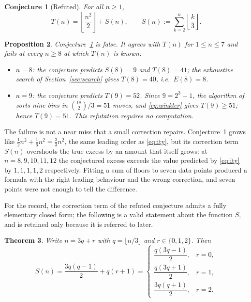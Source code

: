 \documentclass[11pt]{amsart}
\theoremstyle{plain}
\newtheorem{theorem}{Theorem}[section]
\newtheorem{proposition}[theorem]{Proposition}
\newtheorem{conjecture}[theorem]{Conjecture}
\theoremstyle{definition}
\theoremstyle{remark}
\begin{document}
\begin{conjecture}[Refuted]
\label{conj:main}
For all $n\ge 1$,
\[
T(n) = \left\lfloor \frac{n^2}{2}\right\rfloor + S(n), \qquad S(n) := \sum_{k=2}^n \left\lfloor \frac{k}{3}\right\rfloor.
\]
\end{conjecture}

\begin{proposition}
\label{prop:refutation}
Conjecture~\ref{conj:main} is false. It agrees with $T(n)$ for $1\le n\le 7$ and fails at every $n\ge 8$ at which $T(n)$ is known:
\begin{itemize}[leftmargin=*]
\item $n=8$: the conjecture predicts $S(8)=9$ and $T(8)=41$; the exhaustive search of Section~\ref{sec:search} gives $T(8)=40$, i.e.\ $E(8)=8$.
\item $n=9$: the conjecture predicts $T(9)=52$. Since $9=2^3+1$, the algorithm of \cite{ITY} sorts nine bins in $\binom{18}{2}/3=51$ moves, and \eqref{eq:winkler} gives $T(9)\ge 51$; hence $T(9)=51$. This refutation requires no computation.
\end{itemize}
\end{proposition}

The failure is not a near miss that a small correction repairs. Conjecture~\ref{conj:main} grows like $\tfrac12 n^2 + \tfrac16 n^2 = \tfrac23 n^2$, the same leading order as \eqref{eq:ity}, but its correction term $S(n)$ overshoots the true excess by an amount that itself grows: at $n=8,9,10,11,12$ the conjectured excess exceeds the value predicted by \eqref{eq:ity} by $1,1,1,1,2$ respectively. Fitting a sum of floors to seven data points produced a formula with the right leading behaviour and the wrong correction, and seven points were not enough to tell the difference.

For the record, the correction term of the refuted conjecture admits a fully elementary closed form; the following is a valid statement about the function $S$, and is retained only because it is referred to later.

\begin{theorem}
\label{thm:closedform}
Write $n = 3q+r$ with $q=\lfloor n/3\rfloor$ and $r\in\{0,1,2\}$. Then
\[
S(n) = \frac{3q(q-1)}{2} + q(r+1) =
\begin{cases}
\dfrac{q(3q-1)}{2}, & r=0,\\[4pt]
\dfrac{q(3q+1)}{2}, & r=1,\\[4pt]
\dfrac{3q(q+1)}{2}, & r=2.
\end{cases}
\]
\end{theorem}
\end{document}

